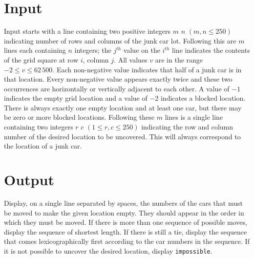 \section*{Input} Input starts with a line containing two positive integers $m$
$n$ $(m, n \leq 250)$ indicating number of rows and columns
of the junk car lot. Following this are
$m$ lines each containing $n$ integers; the $j^{th}$ value on the $i^{th}$ line
indicates the contents of the grid square at row $i$, column $j$.
All values $v$ are in the range $-2 \leq v \leq 62\,500$.
Each non-negative value indicates that half of a junk car is in that location.
Every non-negative
value appears exactly twice and these two occurrences
are horizontally or vertically adjacent to each other.
A value of $-1$ indicates the empty grid location and a value of
$-2$ indicates a blocked location.
There is always exactly one empty location and
at least one car, but
there may be zero or more blocked locations.
Following these $m$ lines is a single line containing two
integers $r$ $c$ $(1 \leq r,c \leq 250)$ indicating the row and column number of the
desired location to be uncovered. This
will always correspond to the location of a junk car.

\section*{Output} Display, on a single line separated by spaces, the numbers
of the cars that
must be moved to make the given location empty. They should appear in the
order in which they must be moved.  If there is
more than one sequence of possible moves, display the sequence of shortest
length. If there is still a tie, display the sequence that comes
lexicographically first according to the car numbers in the sequence.
If it is not possible to
uncover the desired location, display {\tt impossible}. 
